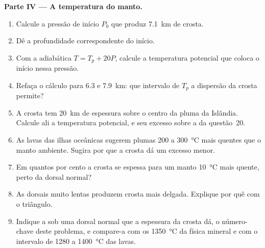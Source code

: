 \begin{problem}
\noindent\textbf{Parte IV --- A temperatura do manto.}
\begin{enumerate}[resume]
\item Calcule a pressão de início $P_0$ que produz \qty{7.1}{km} de crosta.
\item Dê a profundidade correspondente do início.
\item Com a adiabática $T = T_p + 20P$, calcule a temperatura potencial que
coloca o início nessa pressão.
\item Refaça o cálculo para 6.3 e \qty{7.9}{km}: que intervalo de $T_p$ a
dispersão da crosta permite?
\item A crosta tem \qty{20}{km} de espessura sobre o centro da pluma da Islândia. Calcule
ali a temperatura potencial, e seu excesso sobre a da questão~20.
\item As lavas das ilhas oceânicas sugerem plumas 200 a \qty{300}{\celsius} mais quentes que
o manto ambiente. Sugira por que a crosta dá um excesso menor.
\item Em quantos por cento a crosta se espessa para um manto \qty{10}{\celsius}
mais quente, perto da dorsal normal?
\item As dorsais muito lentas produzem crosta mais delgada. Explique por quê com o triângulo.
\item Indique a  sob uma dorsal normal que
a espessura da crosta dá, o número-chave deste problema, e compare-a
com os \qty{1350}{\celsius} da física mineral e com o intervalo de 1280 a
\qty{1400}{\celsius} das lavas.
\end{enumerate}
\end{problem}
